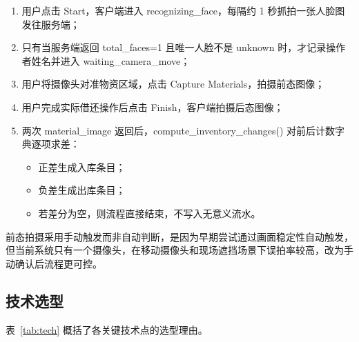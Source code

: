 \documentclass[12pt]{article}
\newcommand{\code}[1]{{\ttfamily #1}}
\begin{document}
\begin{enumerate}
	\item 用户点击 Start，客户端进入 \code{recognizing\_face}，每隔约 1 秒抓拍一张人脸图发往服务端；
	\item 只有当服务端返回 \code{total\_faces=1} 且唯一人脸不是 \code{unknown} 时，才记录操作者姓名并进入 \code{waiting\_camera\_move}；
	\item 用户将摄像头对准物资区域，点击 \code{Capture Materials}，拍摄前态图像；
	\item 用户完成实际借还操作后点击 Finish，客户端拍摄后态图像；
	\item 两次 \code{material\_image} 返回后，\code{compute\_inventory\_changes()} 对前后计数字典逐项求差：
	      \begin{itemize}
		      \item 正差生成入库条目；
		      \item 负差生成出库条目；
		      \item 若差分为空，则流程直接结束，不写入无意义流水。
	      \end{itemize}
\end{enumerate}

前态拍摄采用手动触发而非自动判断，是因为早期尝试通过画面稳定性自动触发，但当前系统只有一个摄像头，在移动摄像头和现场遮挡场景下误拍率较高，改为手动确认后流程更可控。

\subsection{技术选型}

表~\ref{tab:tech} 概括了各关键技术点的选型理由。
\end{document}
